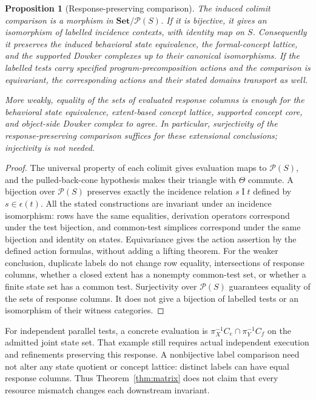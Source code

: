 \documentclass[11pt]{article}
\newtheorem{proposition}[theorem]{Proposition}
\theoremstyle{definition}\newtheorem{definition}[theorem]{Definition}
\theoremstyle{remark}\newtheorem{remark}[theorem]{Remark}
\newcommand{\Set}{\mathbf{Set}}
\begin{document}
\begin{proposition}[Response-preserving comparison]\label{prop:slice}
The induced colimit comparison is a morphism in $\Set/\mathcal P(S)$.
If it is bijective, it gives an isomorphism of labelled incidence contexts,
with identity map on $S$. Consequently it preserves the induced behavioral
state equivalence, the formal-concept lattice, and the supported Dowker
complexes up to their canonical isomorphisms. If the labelled tests carry
specified program-precomposition actions and the comparison is equivariant,
the corresponding actions and their stated domains transport as well.

More weakly, equality of the sets of evaluated response columns is enough
for the behavioral state equivalence, extent-based concept lattice,
supported concept core, and object-side Dowker complex to agree. In
particular, surjectivity of the response-preserving comparison suffices
for these extensional conclusions; injectivity is not needed.
\end{proposition}
\begin{proof}
The universal property of each colimit gives evaluation maps to
$\mathcal P(S)$, and the pulled-back-cone hypothesis makes their triangle
with $\Theta$ commute. A bijection over $\mathcal P(S)$ preserves exactly
the incidence relation $s\mathrel I t$ defined by $s\in\epsilon(t)$.
All the stated constructions are invariant under an incidence isomorphism:
rows have the same equalities, derivation operators correspond under the
test bijection, and common-test simplices correspond under the same
bijection and identity on states. Equivariance gives the action assertion
by the defined action formulas, without adding a lifting theorem.
For the weaker conclusion, duplicate labels do not change row equality,
intersections of response columns, whether a closed extent has a
nonempty common-test set, or whether a finite state set has a common
test. Surjectivity over $\mathcal P(S)$ guarantees equality of the
sets of response columns. It does not give a bijection of labelled tests
or an isomorphism of their witness categories.
\end{proof}

For independent parallel tests, a concrete evaluation is
$\pi_X^{-1}C_e\cap\pi_Y^{-1}C_f$ on the admitted joint state set.
That example still requires actual independent execution and refinements
preserving this response. A nonbijective label comparison need not alter
any state quotient or concept lattice: distinct labels can have equal
response columns. Thus Theorem~\ref{thm:matrix} does not claim that every
resource mismatch changes each downstream invariant.
\end{document}
